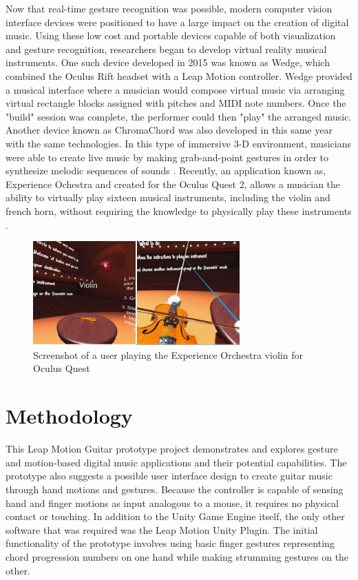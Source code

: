 \documentclass{vgtc}                          %
\begin{document}
Now that real-time gesture recognition was possible, modern computer vision interface devices were positioned to have a large impact on the creation of digital music. Using these low cost and portable devices capable of both visualization and gesture recognition, researchers began to develop virtual reality musical instruments. One such device developed in 2015 was known as Wedge, which combined the Oculus Rift headset with a Leap Motion controller. Wedge provided a musical interface where a musician would compose virtual music via arranging virtual rectangle blocks assigned with pitches and MIDI note numbers. Once the "build" session was complete, the performer could then "play" the arranged music. Another device known as ChromaChord was also developed in this same year with the same technologies. In this type of immersive 3-D environment, musicians were able to create live music by making grab-and-point gestures in order to synthesize melodic sequences of sounds \cite{Serafin:2016:VRM}. Recently, an application known as, Experience Ochestra and created for the Oculus Quest 2, allows a musician the ability to virtually play sixteen musical instruments, including the violin and french horn, without requiring the knowledge to physically play these instruments \cite{Choi:2022:EOM}.
\begin{figure}[H]
\centering
\includegraphics[height=4cm]{pictures/experience-orchestra-violin.JPG}
\centering
\caption{Screenshot of a user playing the Experience Orchestra violin for Oculus Quest \cite{Choi:2022:EOM}}
\end{figure}
\section{Methodology}

This Leap Motion Guitar prototype project demonstrates and explores gesture and motion-based digital music applications and their potential capabilities. The prototype also suggests a possible user interface design to create guitar music through hand motions and gestures. Because the controller is capable of sensing hand and finger motions as input analogous to a mouse, it requires no physical contact or touching. In addition to the Unity Game Engine itself, the only other software that was required was the Leap Motion Unity Plugin. The initial functionality of the prototype involves using basic finger gestures representing chord progression numbers on one hand while making strumming gestures on the other.  
\end{document}
